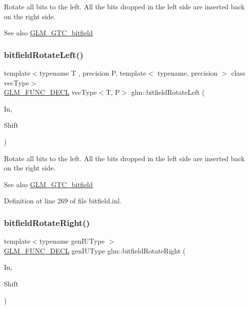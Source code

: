 Rotate all bits to the left. All the bits dropped in the left side are inserted back on the right side.

\begin{DoxySeeAlso}{See also}
\mbox{\hyperlink{group__gtc__bitfield}{G\+L\+M\+\_\+\+G\+T\+C\+\_\+bitfield}} 
\end{DoxySeeAlso}
\mbox{\label{group__gtc__bitfield_ga410d130917d85b865718e3ebc32cf0ef}} 
\subsubsection{\texorpdfstring{bitfieldRotateLeft()}{bitfieldRotateLeft()}\hspace{0.1cm}{\footnotesize\ttfamily [2/2]}}
{\footnotesize\ttfamily template$<$typename T , precision P, template$<$ typename, precision $>$ class vec\+Type$>$ \\
\mbox{\hyperlink{setup_8hpp_ab2d052de21a70539923e9bcbf6e83a51}{G\+L\+M\+\_\+\+F\+U\+N\+C\+\_\+\+D\+E\+CL}} vec\+Type$<$T, P$>$ glm\+::bitfield\+Rotate\+Left (\begin{DoxyParamCaption}\item[{vec\+Type$<$ T, P $>$ const \&}]{In,  }\item[{int}]{Shift }\end{DoxyParamCaption})}

Rotate all bits to the left. All the bits dropped in the left side are inserted back on the right side.

\begin{DoxySeeAlso}{See also}
\mbox{\hyperlink{group__gtc__bitfield}{G\+L\+M\+\_\+\+G\+T\+C\+\_\+bitfield}} 
\end{DoxySeeAlso}


Definition at line 269 of file bitfield.\+inl.

\mbox{\label{group__gtc__bitfield_ga1c33d075c5fb8bd8dbfd5092bfc851ca}} 
\subsubsection{\texorpdfstring{bitfieldRotateRight()}{bitfieldRotateRight()}\hspace{0.1cm}{\footnotesize\ttfamily [1/2]}}
{\footnotesize\ttfamily template$<$typename gen\+I\+U\+Type $>$ \\
\mbox{\hyperlink{setup_8hpp_ab2d052de21a70539923e9bcbf6e83a51}{G\+L\+M\+\_\+\+F\+U\+N\+C\+\_\+\+D\+E\+CL}} gen\+I\+U\+Type glm\+::bitfield\+Rotate\+Right (\begin{DoxyParamCaption}\item[{gen\+I\+U\+Type}]{In,  }\item[{int}]{Shift }\end{DoxyParamCaption})}

